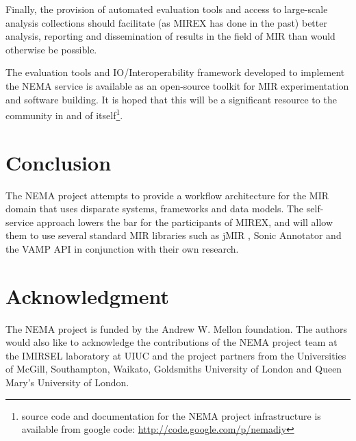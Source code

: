 \documentclass[conference]{IEEEtran}
\begin{document}
Finally, the provision of automated evaluation tools and access to large-scale analysis collections should facilitate (as MIREX has done in the past) better analysis, reporting and dissemination of results in the field of MIR than would otherwise be possible.

The evaluation tools and IO/Interoperability framework developed to implement the NEMA service is available as an open-source toolkit for MIR experimentation and software building. It is hoped that this will be a significant resource to the community in and of itself\footnote{source code and documentation for the NEMA project infrastructure is available from google code: \url{http://code.google.com/p/nemadiy}}. 


\section{Conclusion}
The NEMA project attempts to provide a workflow architecture for the MIR domain that uses disparate systems, frameworks and data models. The self-service approach lowers the bar for the participants of MIREX, and will allow them to use several standard MIR libraries such as  jMIR \cite{mckay2009jmir}, Sonic Annotator and the VAMP API \cite{cannam2006sonic} in conjunction with their own research.


\section*{Acknowledgment}
The NEMA project is funded by the Andrew W. Mellon foundation. The authors would also like to acknowledge the contributions of the NEMA project team at the IMIRSEL laboratory at UIUC and the project partners from the Universities of McGill, Southampton, Waikato, Goldsmiths University of London and Queen Mary's University of London.




\end{document}
